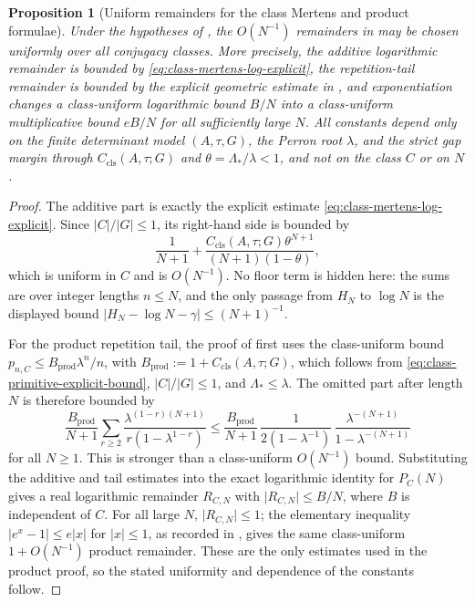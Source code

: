 \documentclass[11pt,a4paper]{amsart}
\theoremstyle{plain}
\newtheorem{proposition}[theorem]{Proposition}
\theoremstyle{definition}
\theoremstyle{remark}
\newcommand{\abs}[1]{\lvert #1 \rvert}
\begin{document}
\begin{proposition}[Uniform remainders for the class Mertens and product formulae]
  \label{prop:main-ii-iii-remainder-audit}
  Under the hypotheses of , the
  \(O(N^{-1})\) remainders in
   may be
  chosen uniformly over all conjugacy classes.  More precisely, the additive
  logarithmic remainder is bounded by
  \eqref{eq:class-mertens-log-explicit}, the repetition-tail remainder is
  bounded by the explicit geometric estimate in
  , and exponentiation changes a
  class-uniform logarithmic bound \(B/N\) into a class-uniform multiplicative
  bound \(eB/N\) for all sufficiently large \(N\).  All constants depend only
  on the finite determinant model \((A,\tau,G)\), the Perron root \(\lambda\),
  and the strict gap margin through \(C_{\mathrm{cls}}(A,\tau;G)\) and
  \(\theta=\Lambda_*/\lambda<1\), and not on the class \(C\) or on \(N\).
\end{proposition}

\begin{proof}
  The additive part is exactly the explicit estimate
  \eqref{eq:class-mertens-log-explicit}.  Since \(|C|/|G|\le1\), its right-hand
  side is bounded by
  \[
    \frac{1}{N+1}
    +
    \frac{C_{\mathrm{cls}}(A,\tau;G)\theta^{N+1}}
      {(N+1)(1-\theta)},
  \]
  which is uniform in \(C\) and is \(O(N^{-1})\).  No floor term is hidden here:
  the sums are over integer lengths \(n\le N\), and the only passage from
  \(H_N\) to \(\log N\) is the displayed bound
  \(\abs{H_N-\log N-\gamma}\le (N+1)^{-1}\).

  For the product repetition tail, the proof of
   first uses the class-uniform bound
  \(p_{n,C}\le B_{\mathrm{prod}}\lambda^n/n\), with
  \(B_{\mathrm{prod}}:=1+C_{\mathrm{cls}}(A,\tau;G)\), which follows from
  \eqref{eq:class-primitive-explicit-bound}, \(|C|/|G|\le1\), and
  \(\Lambda_*\le\lambda\).  The omitted part after length \(N\) is therefore
  bounded by
  \[
    \frac{B_{\mathrm{prod}}}{N+1}
    \sum_{r\ge2}\frac{\lambda^{(1-r)(N+1)}}{r(1-\lambda^{1-r})}
    \le
    \frac{B_{\mathrm{prod}}}{N+1}\,
    \frac{1}{2(1-
    \lambda^{-1})}\,
    \frac{\lambda^{-(N+1)}}{1-\lambda^{-(N+1)}}
  \]
  for all \(N\ge1\).  This is stronger than a class-uniform
  \(O(N^{-1})\) bound.  Substituting the additive and tail estimates into the
  exact logarithmic identity for \(P_C(N)\) gives a real logarithmic remainder
  \(R_{C,N}\) with \(\abs{R_{C,N}}\le B/N\), where \(B\) is independent of
  \(C\).  For all large \(N\), \(\abs{R_{C,N}}\le1\); the elementary inequality
  \(\abs{e^x-1}\le e\abs{x}\) for \(\abs{x}\le1\), as recorded in
  , gives the same
  class-uniform \(1+O(N^{-1})\) product remainder.  These are the only estimates
  used in the product proof, so the stated uniformity and dependence of the
  constants follow.
\end{proof}
\end{document}

